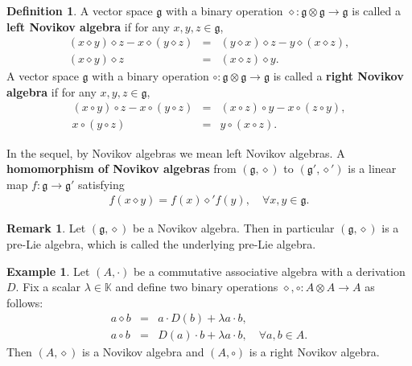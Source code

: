 \documentclass[12pt]{amsart}
\theoremstyle{definition}
\newtheorem{ex}[thm]{Example}
\newtheorem{rmk}[thm]{Remark}
\newtheorem{defi}[thm]{Definition}
\newcommand{\g}{\mathfrak g}
\newcommand{\ot}{\otimes}
\begin{document}
\begin{defi}\label{def-l-r-Nov}
A vector space $\g$ with a binary operation $\diamond:\g\ot\g\to\g$ is called a {\bf left Novikov algebra} if for any $x,y,z\in \g$,
\begin{eqnarray}
(x\diamond y)\diamond z-x\diamond (y\diamond z)&=&(y\diamond x)\diamond z-y\diamond (x\diamond z),\label{l-Nov-1}\\
(x\diamond y)\diamond z&=&(x\diamond z)\diamond y.\label{l-Nov-2}
\end{eqnarray}
A vector space $\g$ with a binary operation $\circ:\g\ot\g\to\g$ is called a {\bf right Novikov algebra} if for any $x,y,z\in \g$,
\begin{eqnarray*}
(x\circ y)\circ z-x\circ (y\circ z)&=&(x\circ z)\circ y-x\circ (z\circ y),\\
x\circ (y\circ z)&=&y\circ (x\circ z).
\end{eqnarray*}
\end{defi}
In the sequel, by Novikov algebras we mean left Novikov algebras. A \textbf{homomorphism of Novikov algebras} from $(\g,\diamond)$ to $(\g',\diamond')$ is a linear map $f:\g\to \g'$ satisfying
\begin{align*}
	f(x\diamond y)=f(x)\diamond'f(y),\quad \forall x,y\in\g.
\end{align*}

\begin{rmk}
	Let $(\g, \diamond)$ be a Novikov algebra. Then in particular $(\g,\diamond)$ is a pre-Lie algebra, which is called the underlying pre-Lie algebra.
\end{rmk}


\begin{ex}\cite{GD}\label{ex-rN-N}
	Let $(A,\cdot)$ be a commutative associative algebra with a derivation $D$.
	Fix a scalar $\lambda \in \mathds K$ and define two binary operations $\diamond,\circ:A\otimes A\to A$ as follows:
	\begin{eqnarray}
		a\diamond b&=&a\cdot D(b) + \lambda a\cdot b,\\
		a\circ b&=&D(a)\cdot b + \lambda a\cdot b,\quad  \forall a,b\in A.\label{rNov-Dcom}
	\end{eqnarray}
Then $(A,\diamond)$ is a Novikov algebra and $(A,\circ)$ is a right Novikov algebra.
\end{ex}
\end{document}
